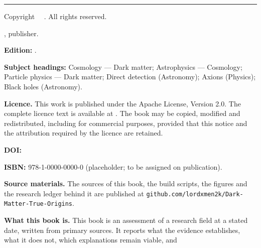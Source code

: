 \clearpage
\thispagestyle{plain}
\noindent{\sffamily\bfseries\color{txt}\bookTitle}\par
\noindent{\sffamily\small\color{txtdim}\bookSubtitle}\par
\vspace{14pt}
\noindent\rule{\textwidth}{0.4pt}\par
\vspace{10pt}
\noindent Copyright \textcopyright\ \bookCopyright\ \bookAuthor. All rights reserved.\par
\vspace{6pt}
\noindent \bookImprint, publisher.\par
\vspace{10pt}
\noindent\textbf{Edition:} \bookEdition.\par
\vspace{6pt}
\noindent\textbf{Subject headings:} Cosmology --- Dark matter; Astrophysics ---
Cosmology; Particle physics --- Dark matter; Direct detection (Astronomy);
Axions (Physics); Black holes (Astronomy).\par
\vspace{10pt}
\noindent\textbf{Licence.} This work is published under the Apache License,
Version 2.0. The complete licence text is available at
\href{https://www.apache.org/licenses/LICENSE-2.0}{}.
The book may be copied, modified and redistributed, including for commercial
purposes, provided that this notice and the attribution required by the licence
are retained.\par
\vspace{10pt}
\noindent\textbf{DOI:} \href{https://doi.org/\bookDOI}{\texttt{\bookDOI}}\par
\vspace{10pt}
\noindent\textbf{ISBN:} 978-1-0000-0000-0 (placeholder; to be assigned on
publication).\par
\vspace{10pt}
\noindent\textbf{Source materials.} The sources of this book, the build scripts,
the figures and the research ledger behind it are published at
\texttt{github.com/lordxmen2k/Dark-Matter-True-Origins}.\par
\vspace{10pt}
\noindent\textbf{What this book is.} This book is an assessment of a research
field at a stated date, written from primary sources. It reports what the
evidence establishes, what it does not, which explanations remain viable, and
